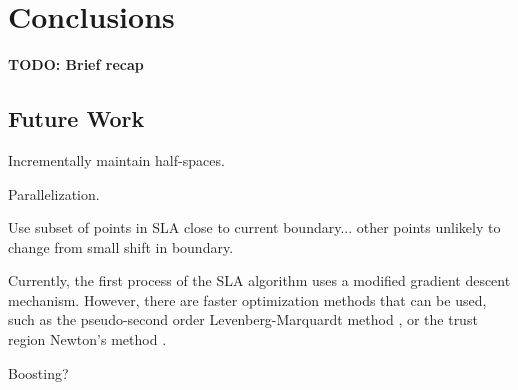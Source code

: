 \section{Conclusions}
\label{cha:conclusions}

{\bf TODO: Brief recap}

\subsection{Future Work}
\label{sec:concl.futurework}

Incrementally maintain half-spaces.

Parallelization.

Use subset of points in SLA close to current boundary... other
points unlikely to change from small shift in boundary.

Currently, the first process of the SLA algorithm uses a modified
gradient descent mechanism. However, there are faster optimization
methods that can be used, such as the pseudo-second order
Levenberg-Marquardt method \cite{Marquardt}, or the trust region
Newton's method \cite{Steihaug}.

Boosting?

